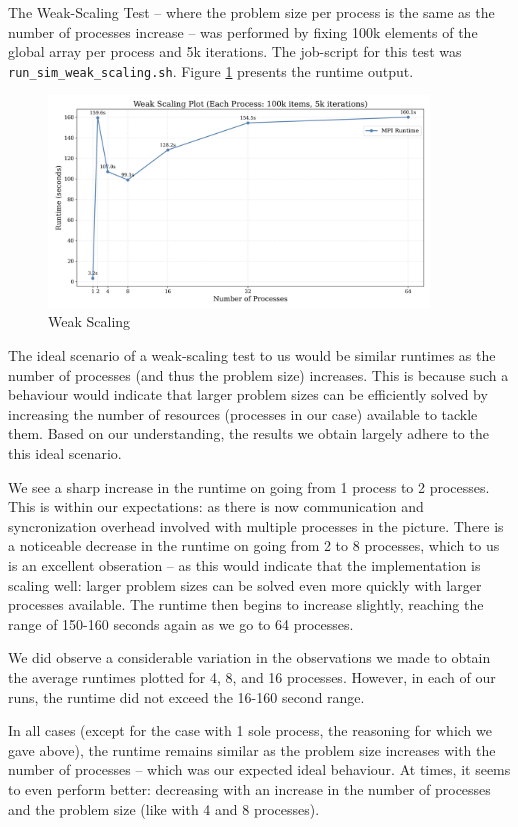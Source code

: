 \documentclass[a4paper,10pt]{article}
\begin{document}
The Weak-Scaling Test -- where the problem size per process is the same as the number of processes increase -- was performed by fixing 100k elements of the global array per process and 5k iterations. The job-script for this test was \verb|run_sim_weak_scaling.sh|. Figure \ref{fig:ex1_weak_scaling} presents the runtime output. 
\begin{figure}[H]
  \centering
  \includegraphics[width=0.9\textwidth]{img/ex1/weak_scaling}
  \caption{Weak Scaling}
  \label{fig:ex1_weak_scaling}
\end{figure}
The ideal scenario of a weak-scaling test to us would be similar runtimes as the number of processes (and thus the problem size) increases. This is because such a behaviour would indicate that larger problem sizes can be efficiently solved by increasing the number of resources (processes in our case) available to tackle them. Based on our understanding, the results we obtain largely adhere to the this ideal scenario.

We see a sharp increase in the runtime on going from 1 process to 2 processes. This is within our expectations: as there is now communication and syncronization overhead involved with multiple processes in the picture. There is a noticeable decrease in the runtime on going from 2 to 8 processes, which to us is an excellent obseration -- as this would indicate that the implementation is scaling well: larger problem sizes can be solved even more quickly with larger processes available. The runtime then begins to increase slightly, reaching the range of 150-160 seconds again as we go to 64 processes.

We did observe a considerable variation in the observations we made to obtain the average runtimes plotted for 4, 8, and 16 processes. However, in each of our runs, the runtime did not exceed the 16-160 second range. 

In all cases (except for the case with 1 sole process, the reasoning for which we gave above), the runtime remains similar as the problem size increases with the number of processes -- which was our expected ideal behaviour. At times, it seems to even perform better: decreasing with an increase in the number of processes and the problem size (like with 4 and 8 processes). 
\end{document}
